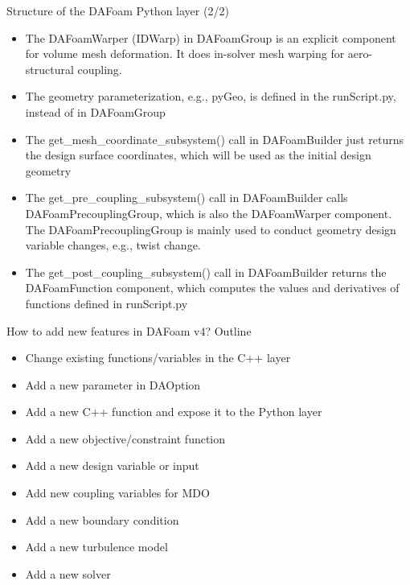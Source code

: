 \documentclass{bredelebeamer}
\begin{document}
\begin{frame}[fragile]{Structure of the DAFoam Python layer (2/2)}


\begin{itemize}
  \setlength\itemsep{0.5em}
  \item The DAFoamWarper (IDWarp) in DAFoamGroup is an explicit component for volume mesh deformation. It does in-solver mesh warping for aero-structural coupling.
  \item The geometry parameterization, e.g., pyGeo, is defined in the runScript.py, instead of in DAFoamGroup
  \item The get\_mesh\_coordinate\_subsystem() call in DAFoamBuilder just returns the design surface coordinates, which will be used as the initial design geometry
  \item The get\_pre\_coupling\_subsystem() call in DAFoamBuilder calls DAFoamPrecouplingGroup, which is also the DAFoamWarper component. The DAFoamPrecouplingGroup is mainly used to conduct geometry design variable changes, e.g., twist change.
  \item The get\_post\_coupling\_subsystem() call in DAFoamBuilder returns the DAFoamFunction component, which computes the values and derivatives of functions defined in runScript.py
\end{itemize}
  
\end{frame}



\begin{frame}{How to add new features in DAFoam v4?}
  Outline
  \begin{itemize}
  \item Change existing functions/variables in the C++ layer
  \item Add a new parameter in DAOption
  \item Add a new C++ function and expose it to the Python layer
  \item Add a new objective/constraint function
  \item Add a new design variable or input
  \item Add new coupling variables for MDO
  \item Add a new boundary condition
  \item Add a new turbulence model
  \item Add a new solver

\end{itemize}
\end{frame}
\end{document}
